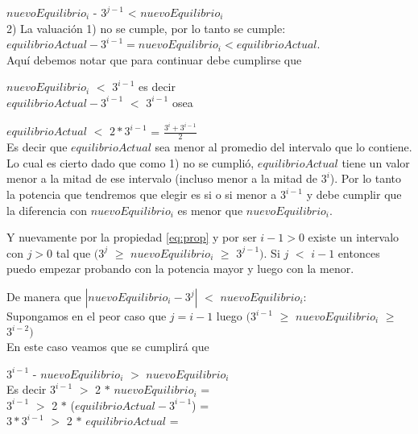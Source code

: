 $nuevoEquilibrio_{i}$ - $3^{j-1}$ < $nuevoEquilibrio_{i}$ \\

2) La valuación 1) no se cumple, por lo tanto se cumple:\\

$equilibrioActual - 3^{i-1} = nuevoEquilibrio_{i} < equilibrioActual$. \\

Aquí debemos notar que para continuar debe cumplirse que 

$nuevoEquilibrio_{i}$ $<$ $3^{i-1}$ es decir \\

$equilibrioActual - 3^{i-1}$ $<$ $3^{i-1}$ osea 

$equilibrioActual$ $<$ $2 \ast 3^{i-1}$ = $\frac{3^{i}+3^{i-1}}{2}$ \\ 

Es decir que $equilibrioActual$ sea menor al promedio del intervalo que lo contiene. Lo cual es cierto dado que como 1) no se cumplió, $equilibrioActual$ tiene un valor menor a la mitad de ese intervalo (incluso menor a la mitad de $3^i$). Por lo tanto la potencia que tendremos que elegir es si o si menor a $3^{i-1}$ y debe cumplir que la diferencia con $nuevoEquilibrio_{i}$ es menor que $nuevoEquilibrio_{i}$.

Y nuevamente por la propiedad \eqref{eq:prop} y por ser $i-1 > 0$ existe un intervalo con $j > 0$ tal que  $(3^j$ $\geq$ $nuevoEquilibrio_{i}$ $\geq$ $3^{j-1})$. Si $j$ $<$ $i-1$ entonces puedo empezar probando con la potencia mayor y luego con la menor.

De manera que $|nuevoEquilibrio_{i} - 3^j|$ $<$ $nuevoEquilibrio_{i}$: \\

Supongamos en el peor caso que $j=i-1$ luego $(3^{i-1}$ $\geq$ $nuevoEquilibrio_{i}$ $\geq$ $3^{i-2})$ \\

En este caso veamos que se cumplirá que 

$3^{i-1}$ - $nuevoEquilibrio_{i}$ $>$ $nuevoEquilibrio_{i}$ \\

Es decir $3^{i-1}$ $>$ 2 $\ast$ $nuevoEquilibrio_{i}$ = \\

$3^{i-1}$ $>$ 2 $\ast$ ($equilibrioActual - 3^{i-1}$) =  \\

$3\ast3^{i-1}$ $>$ 2 $\ast$ $equilibrioActual$ = \\

